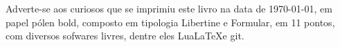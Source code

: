 \pagebreak
\blankpage

\ifodd\thepage\blankpage\fi

\parindent=0pt
\footnotesize\thispagestyle{empty}









\mbox{}\vfill
\begin{center}
		\begin{minipage}{.7\textwidth}\tiny\noindent{}
		\centering\tiny
		Adverte-se aos curiosos que se imprimiu este livro na data de \today, em papel pólen bold, composto em tipologia Libertine e Formular, em 11 pontos, com diversos sofwares livres,
		dentre eles Lua\LaTeX e git.\\ 
		\medskip\\\
		\end{minipage}
\end{center}
